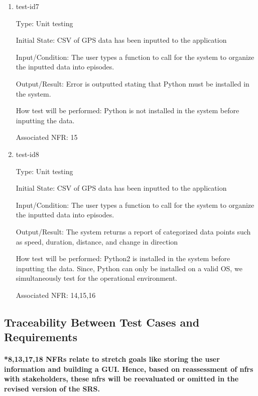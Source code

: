 \documentclass[12pt, titlepage]{article}
\begin{document}
\begin{enumerate}

\item{test-id7\\}

Type: Unit testing
					
Initial State: CSV of GPS data has been inputted to the application
					
Input/Condition: The user types a function to call for the system to organize the
inputted data into episodes. 
					
Output/Result: Error is outputted stating that Python must be installed in the system.
					
How test will be performed: Python is not installed in the system before inputting the data. 

Associated NFR: 15

\item{test-id8\\}

Type: Unit testing
					
Initial State: CSV of GPS data has been inputted to the application
					
Input/Condition: The user types a function to call for the system to organize the
inputted data into episodes. 
					
Output/Result: The system returns a report of categorized data points such
as speed, duration, distance, and change in direction
					
How test will be performed: Python2 is installed in the system before inputting the data. Since, Python can only be installed on a valid OS, we simultaneously test for the operational environment.

Associated NFR: 14,15,16

\end{enumerate}
\subsection{Traceability Between Test Cases and Requirements}

\paragraph{*8,13,17,18 NFRs relate to stretch goals like storing the user information and building a GUI. Hence, based on reassessment of nfrs with stakeholders, these nfrs will be reevaluated or omitted in the revised version of the SRS.}
\end{document}
